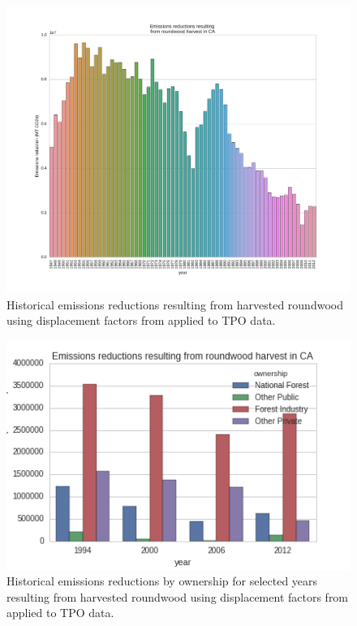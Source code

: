 \documentclass[a4paper,titlepage]{article}
\begin{document}
\begin{figure}[htb]
\centering
\includegraphics[width=\textwidth]{./graphics/ann_hh_em_reduc.pdf}
\caption{Historical emissions reductions resulting from harvested roundwood using displacement factors from \citep{Sathre2010} applied to TPO data.\label{em_reduc_hist}}
\end{figure}

\begin{figure}[htb]
\centering
\includegraphics[width=.9\linewidth]{./graphics/harv_em_reductions.png}
\caption{\label{fig:orgparagraph1}
Historical emissions reductions by ownership for selected years resulting from harvested roundwood using displacement factors from \citep{Sathre2010} applied to TPO data. \label{em_reduc_own}}
\end{figure}
\end{document}
